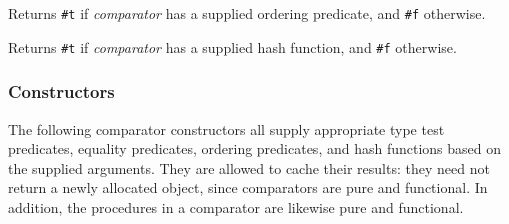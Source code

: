 \begin{entry}{%
  }

  Returns \texttt{\#t} if \emph{comparator} has a supplied ordering
  predicate, and \texttt{\#f} otherwise.
\end{entry}

\begin{entry}{%
  }

  Returns \texttt{\#t} if \emph{comparator} has a supplied hash
  function, and \texttt{\#f} otherwise.
\end{entry}

\hypertarget{Constructors}{\subsubsection{Constructors}}

The following comparator constructors all supply appropriate type test
predicates, equality predicates, ordering predicates, and hash functions
based on the supplied arguments. They are allowed to cache their
results: they need not return a newly allocated object, since
comparators are pure and functional. In addition, the procedures in a
comparator are likewise pure and functional.

